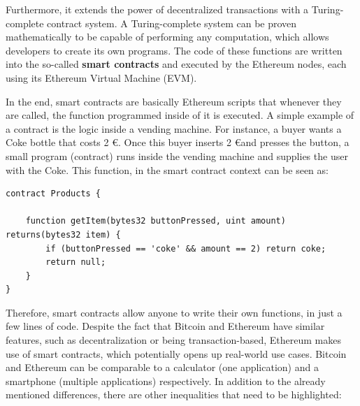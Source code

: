 Furthermore, it extends the power of decentralized transactions with a Turing-complete contract system. A Turing-complete system can be proven mathematically to be capable of performing any computation, which allows developers to create its own programs. The code of these functions are written into the so-called \textbf{smart contracts} and executed by the Ethereum nodes, each using its Ethereum Virtual Machine (EVM).

In the end, smart contracts are basically Ethereum scripts that whenever they are called, the function programmed inside of it is executed. A simple example of a contract is the logic inside a vending machine. For instance, a buyer wants a Coke bottle that costs 2 \euro. Once this buyer inserts 2 \euro and presses the button, a small program (contract) runs inside the vending machine and supplies the user with the Coke. This function, in the smart contract context can be seen as:
\newline

\begin{lstlisting}
contract Products {

	function getItem(bytes32 buttonPressed, uint amount) returns(bytes32 item) {
		if (buttonPressed == 'coke' && amount == 2) return coke;
 		return null;
	}
}
\end{lstlisting}

Therefore, smart contracts allow anyone to write their own functions, in just a few lines of code. Despite the fact that Bitcoin and Ethereum have similar features, such as decentralization or being transaction-based, Ethereum makes use of smart contracts, which potentially opens up real-world use cases. Bitcoin and Ethereum can be comparable to a calculator (one application) and a smartphone (multiple applications) respectively. In addition to the already mentioned differences, there are other inequalities that need to be highlighted:


